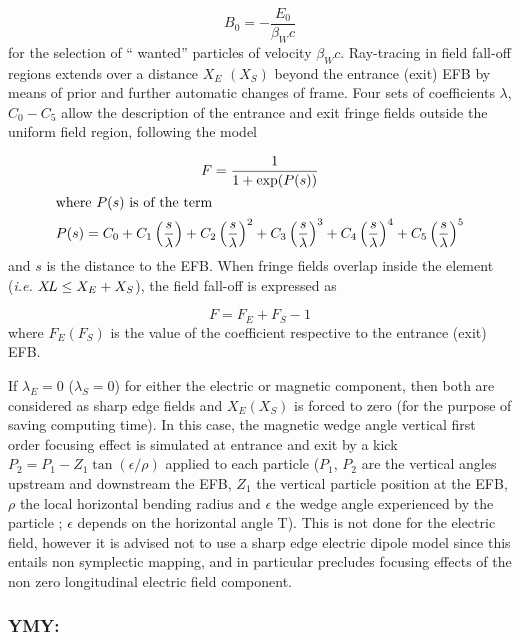  $$ B_0= - \dfrac{E_0 }{ \beta_ Wc} $$
%
 for the selection of `` wanted''  particles of velocity $\beta_Wc $. Ray-tracing in 
field fall-off regions extends over a distance $ X_E $ $ (X_S) $ beyond the
entrance (exit) EFB by means of prior and further automatic changes of frame. Four sets
of coefficients $\lambda$, $ C_0-C_5 $ allow the description of the entrance and exit fringe 
fields outside the uniform field region, following the model~\cite{Biblio12} %

\begin{gather*}
	F = \dfrac{1 }{ 1+ \exp(P(s))} \\
	\intertext{where $  P(s) $ is of the term}
	    P(s) = C_0
	       +C_1 \left(  \dfrac{s }{ \lambda} \right) 
	       +C_2 \left( \dfrac{s }{ \lambda} \right)^2 
	       + C_3 \left( \dfrac{s }{ \lambda} \right)^3 
	       +C_4 \left( \dfrac{s }{ \lambda} \right)^4 
	       + C_5 \left(\dfrac{s }{ \lambda} \right)^5 
\end{gather*}
%
and $ s $ is the distance to the EFB.  When fringe fields overlap
inside the element (\emph{i.e.} $ X\!L\leq X_E+X_S$),  the field fall-off is expressed as

$$ F = F_E + F_S -1 $$
%
 where $ F_E(F_S) $ is the value of the coefficient respective to the entrance (exit) EFB. 
 
\noindent If $ \lambda_ E=0 $  ($\lambda_ S=0$)  for either the electric or
magnetic component, then both are considered as sharp edge fields and $ X_E(X_S) $ is forced 
to zero (for the purpose of saving computing time).  In this case, the magnetic wedge angle vertical first order focusing effect is simulated at entrance and exit by a kick $P_2 = P_1 - Z_1 \tan (\epsilon / \rho)$ applied to each particle ($P_1$, $P_2$ are the vertical angles upstream and downstream the EFB, $Z_1$ the vertical particle position at the EFB, $\rho$ the local horizontal bending radius and $\epsilon$ the wedge angle experienced by the particle ; $\epsilon$ depends on the horizontal angle T). This is not done for the electric field, however it is advised not to use a sharp edge electric dipole model since this entails non symplectic mapping, and in particular precludes focusing effects of the non zero longitudinal electric field component.

\newpage

\subsubsection*{YMY: \YMYTitl} \label{YMY} 

